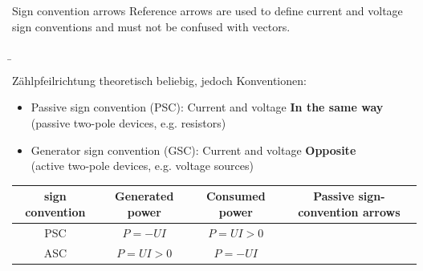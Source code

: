 \begin{frame}
{		
		\begin{Key point}{Sign convention arrows}
			Reference arrows are used to define current and voltage sign conventions and must not be confused with vectors.
		\end{Key point}
		
	}
	
	
	
	\b{
		Zählpfeilrichtung theoretisch beliebig, jedoch Konventionen: 
		\begin{itemize}
			\item Passive sign convention (PSC): Current and voltage \textbf{In the same way}\\
			      (passive two-pole devices, e.g. resistors)
			\item Generator sign convention (GSC): Current and voltage \textbf{Opposite}\\
			      (active two-pole devices, e.g. voltage sources)
		\end{itemize}
		
		
		
		\begin{table}[h!]
			\centering
			\begin{tabular}{|c|c|c|c|}
				\hline
				sign convention & Generated power & Consumed power & Passive sign-convention arrows                                                      \\ \hline
				PSC             & $P = -UI$           & $P = UI > 0$           &  \\ \hline
				ASC             & $P = UI > 0$        & $P = -UI$              &  \\ \hline
			\end{tabular}
			
		\end{table}
		
}
\end{frame}
